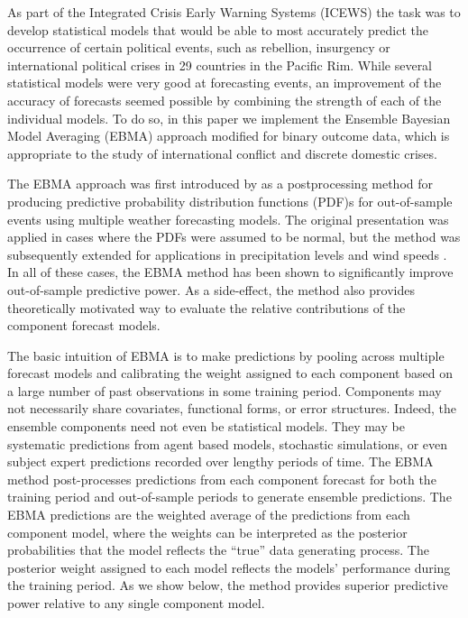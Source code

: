 \documentclass[pdftex,12pt,fullpage,oneside]{amsart}
\begin{document}
As part of the Integrated Crisis Early Warning Systems (ICEWS) the
task was to develop statistical models that would be able to most
accurately predict the occurrence of certain political events, such as
rebellion, insurgency or international political crises in 29
countries in the Pacific Rim. While several statistical models were
very good at forecasting events, an improvement of the accuracy of
forecasts seemed possible by combining the strength of each of the
individual models. To do so, in this paper we implement the Ensemble
Bayesian Model Averaging (EBMA) approach modified for binary outcome
data, which is appropriate to the study of international conflict and
discrete domestic crises.  

The EBMA approach was first introduced by
\citet{Raftery:2005} as a postprocessing method for producing
predictive probability distribution functions (PDF)s for out-of-sample
events using multiple weather forecasting models. The original
presentation was applied in cases where the PDFs were assumed to be
normal, but the method was subsequently extended for applications in
precipitation levels \citep{Sloughter:2007} and wind speeds
\citep{Sloughter:2010}.  In all of these cases, the EBMA method has
been shown to significantly improve out-of-sample predictive power. As
a side-effect, the method also provides theoretically motivated way to
evaluate the relative contributions of the component forecast models.

The basic intuition of EBMA is to make predictions by pooling across
multiple forecast models and calibrating the weight assigned to each
component based on a large number of past observations in some
training period.  Components may not necessarily share covariates,
functional forms, or error structures. Indeed, the ensemble components
need not even be statistical models. They may be systematic
predictions from agent based models, stochastic simulations, or even
subject expert predictions recorded over lengthy periods of time. The
EBMA method post-processes predictions from each component forecast
for both the training period and out-of-sample periods to generate
ensemble predictions. The EBMA predictions are the weighted average of
the predictions from each component model, where the weights can be
interpreted as the posterior probabilities that the model reflects the
``true'' data generating process. The posterior weight assigned to
each model reflects the models' performance during the training
period. As we show below, the method provides superior predictive
power relative to any single component model.
\end{document}
